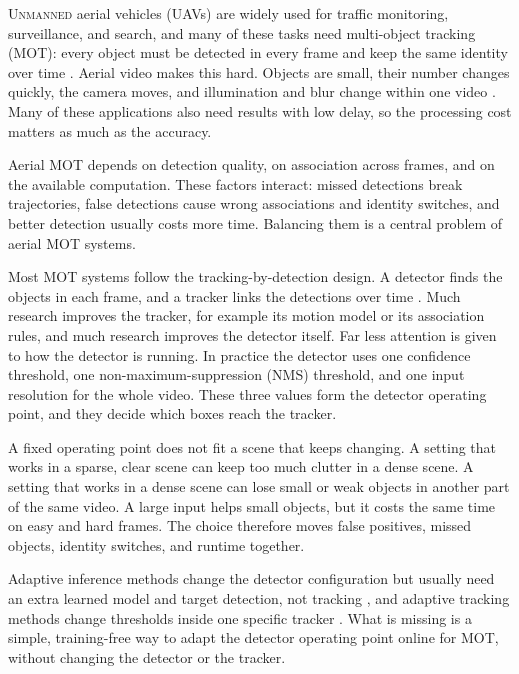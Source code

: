 \documentclass[journal]{new-aiaa}
\begin{document}
\lettrine{U}{nmanned} aerial vehicles (UAVs) are widely used for traffic monitoring,
surveillance, and search, and many of these tasks need multi-object tracking
(MOT): every object must be detected in every frame and keep the same
identity over time \cite{wu2022uavsurvey,zhu2022visdrone}. Aerial video makes
this hard. Objects are small, their number changes quickly, the camera moves,
and illumination and blur change within one video
\cite{zhu2022visdrone,du2018uavdt,cheng2023smallobject}. Many of these
applications also need results with low delay, so the processing cost matters
as much as the accuracy.

Aerial MOT depends on detection quality, on association across frames, and
on the available computation. These factors interact: missed detections break
trajectories, false detections cause wrong associations and identity
switches, and better detection usually costs more time. Balancing them is a
central problem of aerial MOT systems.

Most MOT systems follow the tracking-by-detection design. A detector finds the
objects in each frame, and a tracker links the detections over time
\cite{bewley2016sort,zhang2022bytetrack}. Much research improves the tracker,
for example its motion model or its association rules, and much research
improves the detector itself. Far less attention is given to how the detector
is running. In practice the detector uses one confidence threshold, one
non-maximum-suppression (NMS) threshold, and one input resolution for the
whole video. These three values form the detector operating point, and they
decide which boxes reach the tracker.

A fixed operating point does not fit a scene that keeps changing. A setting
that works in a sparse, clear scene can keep too much clutter in a dense
scene. A setting that works in a dense scene can lose small or weak objects in
another part of the same video. A large input helps small objects, but it
costs the same time on easy and hard frames. The choice therefore moves false
positives, missed objects, identity switches, and runtime together.

Adaptive inference methods change the detector configuration but usually need
an extra learned model and target detection, not tracking
\cite{chin2019adascale,xu2020approxdet}, and adaptive tracking methods change
thresholds inside one specific tracker \cite{ma2023adaptivebytetrack,shim2024adaptrack}.
What is missing is a simple, training-free way to adapt the detector
operating point online for MOT, without changing the detector or the tracker.
\end{document}
